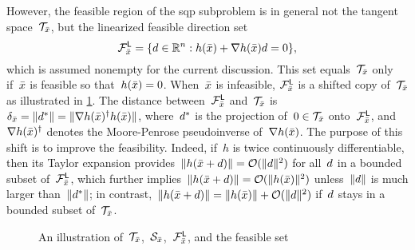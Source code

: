 However, the feasible region of the \gls{sqp} subproblem is in general not the tangent space~$\mathcal{T}_{\bar{\iter}}$, but the linearized feasible direction set
\begin{equation*}
    \mathcal{F}_{\bar{\iter}}^{\mathsf{L}} = \set{\step \in \R^n : h(\bar{\iter}) +\nabla h(\bar{\iter}) \step  = 0},
\end{equation*}
which is assumed nonempty for the current discussion.
This set equals~$\mathcal{T}_{\bar{\iter}}$ only if~$\bar{\iter}$ is feasible so that~$h(\bar{\iter}) = 0$.
When~$\bar{\iter}$ is infeasible, $\mathcal{F}_{\bar{\iter}}^{\mathsf{L}}$ is a shifted copy of~$\mathcal{T}_{\bar{\iter}}$ as illustrated in \cref{fig:sqp-path}.
The distance between~$\mathcal{F}_{\bar{\iter}}^{\mathsf{L}}$ and~$\mathcal{T}_{\bar{\iter}}$ is~$\delta_{\bar{\iter}} = \norm{\step[\ast]} = \norm{\nabla h(\bar{\iter})^{\dagger} h(\bar{\iter})}$, where~$\step[\ast]$ is the projection of~$0 \in \mathcal{T}_{\bar{\iter}}$ onto~$\mathcal{F}_{\bar{\iter}}^{\mathsf{L}}$, and~$\nabla h(\bar{\iter})^{\dagger}$ denotes the Moore-Penrose pseudoinverse of~$\nabla h(\bar{\iter})$.
The purpose of this shift is to improve the feasibility.
Indeed, if~$h$ is twice continuously differentiable, then its Taylor expansion provides~$\norm{h(\bar{\iter} + \step)} = \bigo(\norm{\step}^2)$ for all~$\step$ in a bounded subset of~$\mathcal{F}_{\bar{\iter}}^{\mathsf{L}}$, which further implies~$\norm{h(\bar{\iter} + \step)} = \bigo(\norm{h(\bar{\iter})}^2)$ unless~$\norm{\step}$ is much larger than~$\norm{\step[\ast]}$; in contrast,~$\norm{h(\bar{\iter} + \step)} = \norm{h(\bar{\iter})} + \bigo(\norm{\step}^2)$ if~$\step$ stays in a bounded subset of~$\mathcal{T}_{\bar{\iter}}$.

\begin{figure}[ht]
    \centering
    \caption{An illustration of~$\mathcal{T}_{\bar{\iter}}$,~$\mathcal{S}_{\bar{\iter}}$,~$\mathcal{F}_{\bar{\iter}}^{\mathsf{L}}$, and the feasible set}
    \label{fig:sqp-path}
\end{figure}

